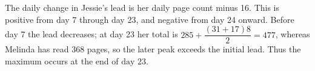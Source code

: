 The daily change in Jessie's lead is her daily page count minus 16. This is positive from day 7 through day 23, and negative from day 24 onward. Before day 7 the lead decreases; at day 23 her total is $285+\dfrac{(31+17)8}{2}=477$, whereas Melinda has read 368 pages, so the later peak exceeds the initial lead. Thus the maximum occurs at the end of $\boxed{\text{day }23}$.
